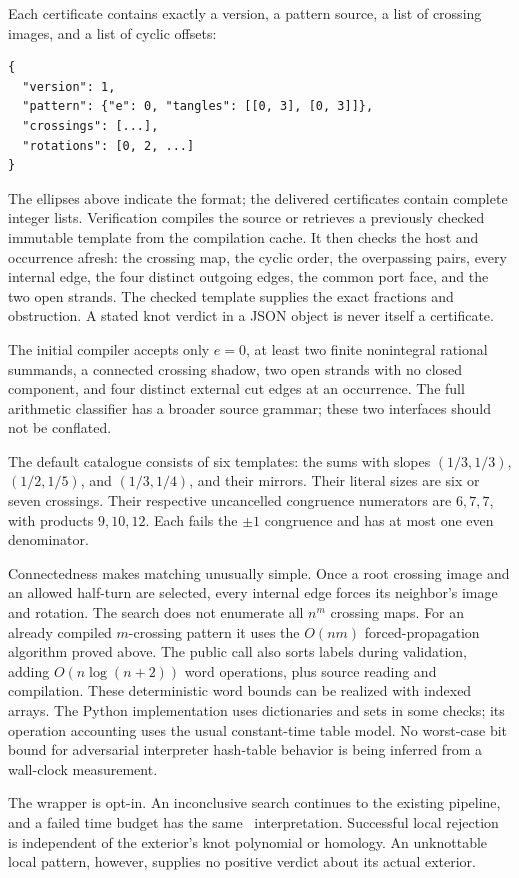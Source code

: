 Each certificate contains exactly a version, a pattern source, a list of
crossing images, and a list of cyclic offsets:
\begin{lstlisting}
{
  "version": 1,
  "pattern": {"e": 0, "tangles": [[0, 3], [0, 3]]},
  "crossings": [...],
  "rotations": [0, 2, ...]
}
\end{lstlisting}
The ellipses above indicate the format; the delivered certificates contain
complete integer lists. Verification compiles the source or retrieves a
previously checked immutable template from the compilation cache. It then
checks the host and occurrence afresh: the crossing map, the cyclic order,
the overpassing pairs, every internal edge, the four distinct outgoing
edges, the common port face, and the two open strands. The checked template supplies the exact fractions
and obstruction. A stated knot verdict
in a JSON object is never itself a certificate.

The initial compiler accepts only \(e=0\), at least two finite nonintegral
rational summands, a connected crossing shadow, two open strands with no
closed component, and four distinct external cut edges at an occurrence.
The full arithmetic classifier has a broader source grammar; these two
interfaces should not be conflated.

The default catalogue consists of six templates: the sums with slopes
\((1/3,1/3)\), \((1/2,1/5)\), and \((1/3,1/4)\), and their mirrors.
Their literal sizes are six or seven crossings. Their respective
uncancelled congruence numerators are \(6,7,7\), with products \(9,10,12\).
Each fails the \(\pm1\) congruence and has at most one even denominator.

Connectedness makes matching unusually simple. Once a root crossing image
and an allowed half-turn are selected, every internal edge forces its
neighbor's image and rotation. The search does not enumerate all
\(n^m\) crossing maps. For an already compiled \(m\)-crossing pattern it
uses the \(O(nm)\) forced-propagation algorithm proved above.
The public call also sorts labels during validation, adding
\(O(n\log(n+2))\) word operations, plus source reading and compilation.
These deterministic word bounds can be realized with indexed arrays.
The Python implementation uses dictionaries and sets in some checks;
its operation accounting uses the usual constant-time table model.
No worst-case bit bound for adversarial interpreter hash-table behavior
is being inferred from a wall-clock measurement.

The wrapper is opt-in. An inconclusive search continues to the existing
pipeline, and a failed time budget has the same \unknown\ interpretation.
Successful local rejection is independent of the exterior's knot
polynomial or homology. An unknottable local pattern, however, supplies
no positive verdict about its actual exterior.

